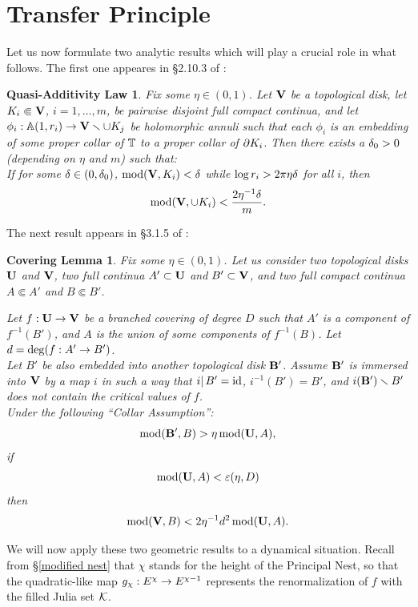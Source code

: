 

\section{Transfer Principle}
\label{covering lemma sec}

Let us now formulate two analytic results
which will play a crucial role in what follows.
The first one appeares in \S 2.10.3 of \cite{covering lemma}:

\newtheorem*{QA}{Quasi-Additivity Law}
\begin{QA}
    Fix some $\eta\in (0,1)$.
Let ${\mathbf{V}}$ be a topological disk,  let  $K_i\Subset {\mathbf{V}} $, $i=1,\dots, m$,
be pairwise disjoint full compact continua, 
and let $\phi_i: {\mathbb A}(1,r_i)\rightarrow {\mathbf{V}} \smallsetminus   \cup K_j$ 
be holomorphic annuli such that each $\phi_i$ is
an  embedding of some proper collar of ${\mathbb T}$  to a proper collar of $\partial K_i$.
Then there exists a ${\delta}_0 > 0$ (depending on $\eta$ and $m$) such that: \\
If  for some ${\delta}\in (0, {\delta}_0)$,
$\operatorname{mod} ({\mathbf{V}}, K_i) < {\delta}$ while $\log r_i > 2\pi \eta{\delta}$  for all $i$,
then
$$
  \operatorname{mod}({\mathbf{V}},  \cup K_i ) < \frac{2 \eta^{-1} {\delta}}{m}.
$$
\end{QA}



The next result appears in \S 3.1.5 of \cite{covering lemma}:

\newtheorem*{Covering}{Covering Lemma}
\begin{Covering}
Fix some  $\eta\in (0,1)$. Let us consider
two topological disks ${\mathbf{U}}$ and ${\mathbf{V}}$, two full continua $A'\subset {\mathbf{U}}$ and $B'\subset {\mathbf{V}}$,
and two full compact continua $A\Subset A'$ and $B\Subset B'$.

  Let $f:{\mathbf{U}} \rightarrow {\mathbf{V}}$ be a branched covering of degree $D$ such that
$A'$ is a component of $f^{-1}(B')$, and $A$ is the union of some components of $f^{-1}(B)$.
Let $d=\deg(f : A'\rightarrow B')$.\\
Let $B'$ be also embedded into another topological disk ${\mathbf{B}}'$.
Assume ${\mathbf{B}}'$ is immersed into
${\mathbf{V}}$ by a map $i$  in such a way that $i|\, B'=\operatorname{id}$, $i^{-1}(B')=B'$,
 and $i({\mathbf{B}}') \smallsetminus B'$ does not contain the critical values of $f$.  \\
Under the following  ``Collar Assumption'':
$$
   \operatorname{mod}({\mathbf{B}}', B) > \eta \operatorname{mod}({\mathbf{U}},  A),
$$
if 
$$ \operatorname{mod}({\mathbf{U}}, A) < {\varepsilon}(\eta, D) $$
 then
$$
      \operatorname{mod} ({\mathbf{V}}, B)  <  2 \eta^{-1} d^2 \operatorname{mod}({\mathbf{U}},  A). 
$$
\end{Covering}  

  We will now apply these two geometric results to a dynamical situation.
  Recall from \S \ref{modified nest} that $\chi$ stands for the height of the Principal Nest, 
so that the quadratic-like map $g_\chi: E^\chi\rightarrow E^{\chi-1}$ represents the
renormalization of $f$ with the filled Julia set ${\mathcal K}$.

